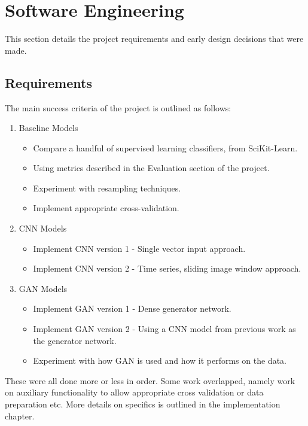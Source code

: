 \documentclass[12pt,a4paper,twoside]{report}
\begin{document}
\section{Software Engineering}

This section details the project requirements and early design decisions that were made.

\subsection{Requirements}
The main success criteria of the project is outlined as follows:

\begin{enumerate}
   \item Baseline Models
   \begin{itemize}
     \item Compare a handful of supervised learning classifiers, from SciKit-Learn.
     \item Using metrics described in the Evaluation section of the project.
     \item Experiment with resampling techniques. 
     \item Implement appropriate cross-validation.
   \end{itemize}
   \item CNN Models
   \begin{itemize}
     \item Implement CNN version 1 - Single vector input approach.
     \item Implement CNN version 2 - Time series, sliding image window approach.
   \end{itemize}
   \item GAN Models
   \begin{itemize}
     \item Implement GAN version 1 - Dense generator network.
     \item Implement GAN version 2 - Using a CNN model from previous work as the generator network.
     \item Experiment with how GAN is used and how it performs on the data.
   \end{itemize}
\end{enumerate}

 These were all done more or less in order. Some work overlapped, namely work on auxiliary functionality to allow appropriate cross validation or data preparation etc. More details on specifics is outlined in the implementation chapter. 
  
\end{document}
